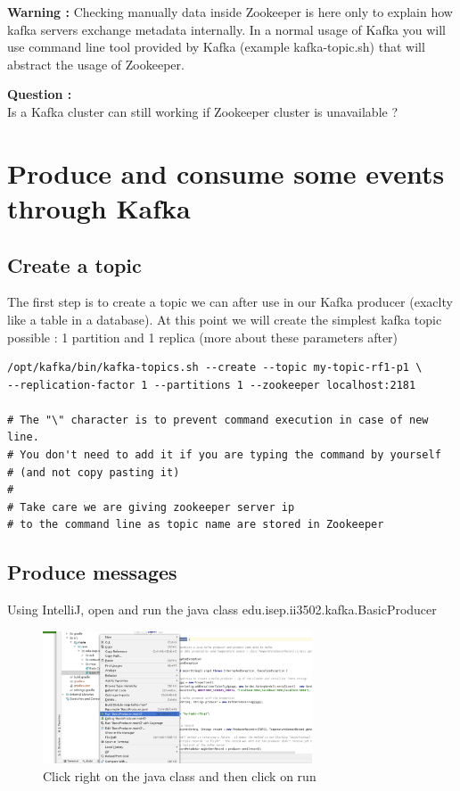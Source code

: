 \documentclass{article}
\newcounter{question}
\newenvironment{question}
    { \begin{mdframed}[backgroundcolor=gray!20] \textbf{Question \arabic{question} : } \stepcounter{question} \\}
    {  \end{mdframed}}
\newenvironment{warning}
    { \begin{mdframed}[backgroundcolor=blue!20] \textbf{Warning : } }
    {  \end{mdframed}}
\newenvironment{code}
    { \begin{mdframed} }    {  \end{mdframed}}
\begin{document}
\begin{warning}
Checking manually data inside Zookeeper is here only to explain how kafka servers exchange metadata internally. In a normal usage of Kafka you will use command line tool provided by Kafka (example kafka-topic.sh) that will abstract the usage of Zookeeper.
\end{warning}

\begin{question}
  Is a Kafka cluster can still working if Zookeeper cluster is unavailable ?  
\end{question}


\section{Produce and consume some events through Kafka}
\subsection{Create a topic}
The first step is to create a topic we can after use in our Kafka producer (exaclty like a table in a database). At this point we will create the simplest kafka topic possible : 1 partition and 1 replica (more about these parameters after)

\begin{code}
    \begin{verbatim}
/opt/kafka/bin/kafka-topics.sh --create --topic my-topic-rf1-p1 \
--replication-factor 1 --partitions 1 --zookeeper localhost:2181

# The "\" character is to prevent command execution in case of new line. 
# You don't need to add it if you are typing the command by yourself 
# (and not copy pasting it)
#
# Take care we are giving zookeeper server ip
# to the command line as topic name are stored in Zookeeper
    \end{verbatim}
\end{code}
\subsection{Produce messages}
Using IntelliJ, open and run the java class edu.isep.ii3502.kafka.BasicProducer

\begin{figure}[H]
\includegraphics[width=8cm]{runJava.png}
\caption{Click right on the java class and then click on run}
\centering
\end{figure}
\end{document}
